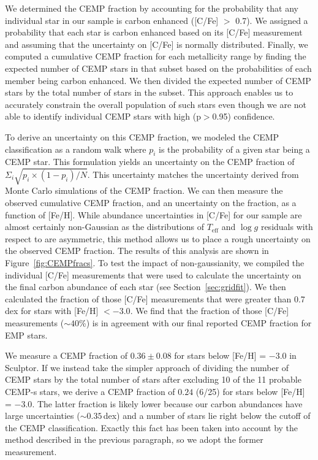 \documentclass{emulateapj-rtx4}
\begin{document}
We determined the CEMP fraction by accounting for the probability that any individual star in our sample is 
carbon enhanced ([C/Fe] $>$ 0.7). We assigned a probability that each star is carbon enhanced based
on its [C/Fe] measurement and assuming that the uncertainty on [C/Fe] is normally distributed. 
Finally, we computed a cumulative CEMP fraction for each metallicity range 
by finding the expected number of CEMP stars in that subset based on the
probabilities of each member being carbon enhanced. 
We then divided the expected number
of CEMP stars by the total number of stars in the subset. 
This approach enables us to accurately constrain the overall population of such stars even though we are not able to identify individual CEMP stars with high (p$>$0.95) confidence.

To derive an uncertainty on this CEMP fraction, we modeled the CEMP classification as a random walk where 
$p_i$ is the probability of a given star being a CEMP star. This formulation yields an uncertainty on the CEMP fraction of 
$\Sigma_i\sqrt{p_i\times(1-p_i)/N}$. This uncertainty matches the uncertainty derived from Monte Carlo simulations
of the CEMP fraction. We can then measure the observed cumulative CEMP fraction, and an uncertainty on the fraction,
as a function of [Fe/H]. 
While abundance uncertainties in [C/Fe] for our sample are almost certainly non-Gaussian 
as the distributions of $T_{\text{eff}}$ and $\log g$ residuals with respect to \citet{kcg+13} 
are asymmetric, this method allows us to place a rough uncertainty on the observed CEMP fraction.
The results of this analysis are shown in Figure~\ref{fig:CEMPfracs}.
To test the impact of non-gaussianity, we compiled the individual [C/Fe] measurements that were used to calculate the uncertainty on the final carbon abundance of each star (see Section~\ref{sec:gridfit}).
We then calculated the fraction of those [C/Fe] measurements that were greater than 0.7\,dex for stars with [Fe/H] $< -3.0$.
We find that the fraction of those [C/Fe] measurements ($\sim40$\%) is in agreement with our final reported CEMP fraction for EMP stars.

We measure a CEMP fraction of $0.36\pm0.08$ for stars below [Fe/H] = $-$3.0 in Sculptor.
If we instead take the simpler approach of dividing the number of CEMP stars by the total
number of stars after excluding 10 of the 11 probable CEMP-s stars, we derive a CEMP fraction of $0.24$ (6/25) for stars below [Fe/H] = $-3.0$. 
The latter fraction is likely lower because our carbon abundances have large uncertainties ($\sim0.35$\,dex) and a number of stars lie right below the cutoff of the CEMP classification. 
Exactly this fact has been taken into account by the method described in the previous paragraph, so we adopt the former measurement. 
\end{document}
